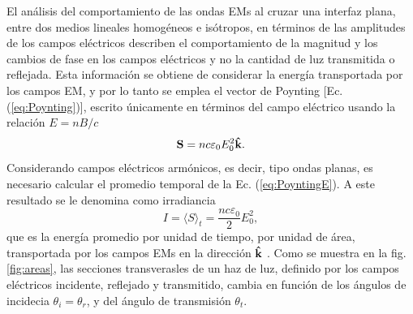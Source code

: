 El análisis del comportamiento de las ondas EMs al cruzar una interfaz plana, entre dos medios lineales homogéneos e isótropos, en términos de las amplitudes de los campos eléctricos describen el comportamiento de la magnitud y los cambios de fase en los campos eléctricos  y no la cantidad de luz transmitida o reflejada. Esta información se obtiene de considerar la energía transportada por los campos EM, y por lo tanto se emplea el vector de Poynting [Ec. (\ref{eq:Poynting})], escrito únicamente en términos del campo eléctrico usando la relación $E = n B/c$
	\begin{equation}
	\vb{S} = n c\varepsilon_0 E_0^2 \vu{k}. \label{eq:PoyntingE}
	\end{equation}
Considerando campos eléctricos armónicos, es decir, tipo ondas planas, es necesario calcular el promedio temporal de la Ec. (\ref{eq:PoyntingE}). A este resultado se le denomina como irradiancia \cite{Hecht}
	\begin{equation}
	I = \langle S \rangle_t = \frac{nc\varepsilon_0}{2} E_0^2 \label{eq:Irr},
	\end{equation}
que es la energía promedio por unidad de tiempo, por unidad de área, transportada por los campos EMs en la dirección $\vu{k}$ \cite{griffiths2013electrodynamics}. Como se muestra en la fig. \ref{fig:areas}, las secciones transverasles de un haz de luz, definido por los campos eléctricos incidente, reflejado y transmitido, cambia en función de los ángulos de incidecia $\theta_i = \theta_r$, y del ángulo de transmisión $\theta_t$.




